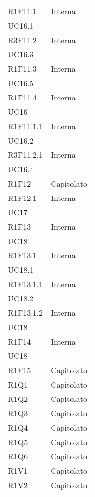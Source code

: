 \begin{longtable}{|C{6.5cm}|C{6.5cm}|}
	R1F11.1 &  \centering Interna \\ UC16.1 \tabularnewline

	R3F11.2 & \centering Interna \\ UC16.3 \tabularnewline

	R1F11.3 & \centering Interna \\ UC16.5 \tabularnewline

	R1F11.4 & \centering Interna \\ UC16 \tabularnewline

	R1F11.1.1 & \centering Interna \\ UC16.2 \tabularnewline

	R3F11.2.1 & \centering Interna \\ UC16.4 \tabularnewline

	R1F12 &   Capitolato \\

	R1F12.1 & \centering Interna \\ UC17 \tabularnewline

	R1F13 & \centering Interna \\ UC18 \tabularnewline

	R1F13.1 & \centering Interna \\ UC18.1 \tabularnewline

	R1F13.1.1 & \centering Interna \\ UC18.2 \tabularnewline

	R1F13.1.2 & \centering Interna \\ UC18 \tabularnewline

	R1F14 & \centering Interna \\ UC18 \tabularnewline

	R1F15 & Capitolato \\

	R1Q1 & Capitolato \\

	R1Q2 & Capitolato \\

	R1Q3 & Capitolato \\

	R1Q4 & Capitolato \\

	R1Q5 & Capitolato \\

	R1Q6 & Capitolato \\

	R1V1 & Capitolato \\

	R1V2 & Capitolato \\


\end{longtable}
